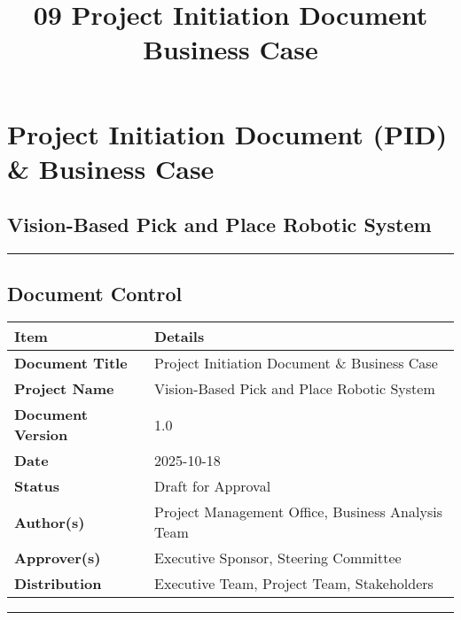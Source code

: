 \documentclass[
]{article}
\title{09 Project Initiation Document Business Case}
\author{}
\date{}
\begin{document}
\maketitle

{
\setcounter{tocdepth}{3}
\tableofcontents
}
\hypertarget{project-initiation-document-pid-business-case}{%
\section{Project Initiation Document (PID) \& Business
Case}\label{project-initiation-document-pid-business-case}}

\hypertarget{vision-based-pick-and-place-robotic-system}{%
\subsection{Vision-Based Pick and Place Robotic
System}\label{vision-based-pick-and-place-robotic-system}}

\begin{center}\rule{0.5\linewidth}{0.5pt}\end{center}

\hypertarget{document-control}{%
\subsection{Document Control}\label{document-control}}

\begin{longtable}[]{@{}ll@{}}
\toprule\noalign{}
\textbf{Item} & \textbf{Details} \\
\midrule\noalign{}
\endhead
\bottomrule\noalign{}
\endlastfoot
\textbf{Document Title} & Project Initiation Document \& Business
Case \\
\textbf{Project Name} & Vision-Based Pick and Place Robotic System \\
\textbf{Document Version} & 1.0 \\
\textbf{Date} & 2025-10-18 \\
\textbf{Status} & Draft for Approval \\
\textbf{Author(s)} & Project Management Office, Business Analysis
Team \\
\textbf{Approver(s)} & Executive Sponsor, Steering Committee \\
\textbf{Distribution} & Executive Team, Project Team, Stakeholders \\
\end{longtable}

\begin{center}\rule{0.5\linewidth}{0.5pt}\end{center}
\end{document}
